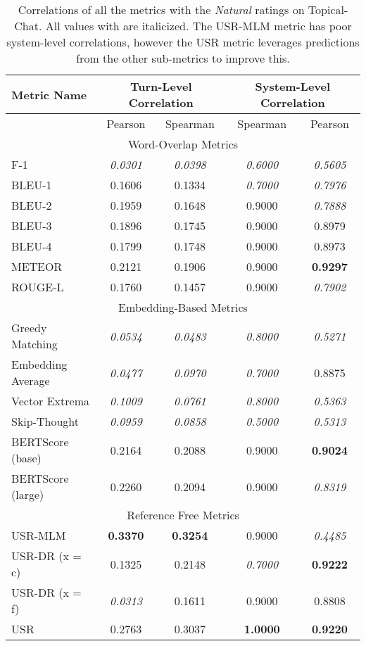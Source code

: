 \documentclass[11pt,a4paper]{article}
\begin{document}
\begin{table*}
    \centering
    \renewcommand*{\arraystretch}{1.2}
    \begin{tabular}{|l|c|c|c|c|}
    \hline
        \textbf{Metric Name} & \multicolumn{2}{|c|}{\textbf{Turn-Level Correlation}} & \multicolumn{2}{|c|}{\textbf{System-Level Correlation}}  \\ \hline
         & Pearson & Spearman & Spearman & Pearson \\ \hline
         \multicolumn{5}{|c|}{Word-Overlap Metrics} \\ \hline
F-1 & \textit{0.0301} & \textit{0.0398} & \textit{0.6000} & \textit{0.5605} \\
BLEU-1 & 0.1606 & 0.1334 & \textit{0.7000} & \textit{0.7976} \\
BLEU-2 & 0.1959 & 0.1648 & 0.9000 & \textit{0.7888} \\
BLEU-3 & 0.1896 & 0.1745 & 0.9000 & 0.8979 \\
BLEU-4 & 0.1799 & 0.1748 & 0.9000 & 0.8973 \\
METEOR & 0.2121 & 0.1906 & 0.9000 & \textbf{0.9297} \\
ROUGE-L & 0.1760 & 0.1457 & 0.9000 & \textit{0.7902} \\  \hline
\multicolumn{5}{|c|}{Embedding-Based Metrics} \\ \hline
Greedy Matching & \textit{0.0534} & \textit{0.0483} & \textit{0.8000} & \textit{0.5271} \\
Embedding Average & \textit{0.0477} & \textit{0.0970} & \textit{0.7000} & 0.8875 \\
Vector Extrema & \textit{0.1009} & \textit{0.0761} & \textit{0.8000} & \textit{0.5363} \\
Skip-Thought & \textit{0.0959} & \textit{0.0858} & \textit{0.5000} & \textit{0.5313} \\
BERTScore (base) & 0.2164 & 0.2088 & 0.9000 & \textbf{0.9024} \\
BERTScore (large) & 0.2260 & 0.2094 & 0.9000 & \textit{0.8319} \\ \hline
\multicolumn{5}{|c|}{Reference Free Metrics} \\ \hline
USR-MLM & \textbf{0.3370} & \textbf{0.3254} & 0.9000 & \textit{0.4485} \\
USR-DR (x = c) & 0.1325 & 0.2148 & \textit{0.7000} & \textbf{0.9222} \\
USR-DR (x = f) & \textit{0.0313} & 0.1611 & 0.9000 & 0.8808 \\
USR & 0.2763 & 0.3037 & \textbf{1.0000} & \textbf{0.9220} \\ \hline
    \end{tabular}
    \caption{Correlations of all the metrics with the \textit{Natural} ratings on Topical-Chat. All values with  are italicized. The USR-MLM metric has poor system-level correlations, however the USR metric leverages predictions from the other sub-metrics to improve this. }
    
\end{table*}
\end{document}

